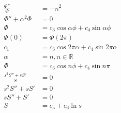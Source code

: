 \documentclass{article}
\begin{document}
\begin{align*}
  \frac{\Phi''}{\Phi}      & = -n^2                                                                                                                                                                            \\
  \Phi'' + \alpha^2 \Phi   & = 0                                                                                                                                                                               \\
  \Phi                     & = c_3 \cos \alpha \phi + c_4 \sin \alpha \phi                                                                                                                                     \\
  \Phi(0)                  & = \Phi(2 \pi)                                                                                                                                                                     \\
  c_1                      & = c_3 \cos 2 \pi \alpha + c_4 \sin 2 \pi \alpha                                                                                                                                   \\
  \alpha                   & = n, n \in \mathbb{R}                                                                                                                                                             \\
  \Phi                     & = c_3 \cos n \phi + c_4 \sin n \pi                                                                                                                                                \\
  \frac{s^2 S'' + s S'}{S} & = 0                                                                                                                                                                               \\
  s^2 S'' + s S'           & = 0                                                                                                                                                                               \\
  s S'' + S'               & = 0                                                                                                                                                                               \\
  S                        & = c_5 + c_6 \ln s
\end{align*}
\end{document}
